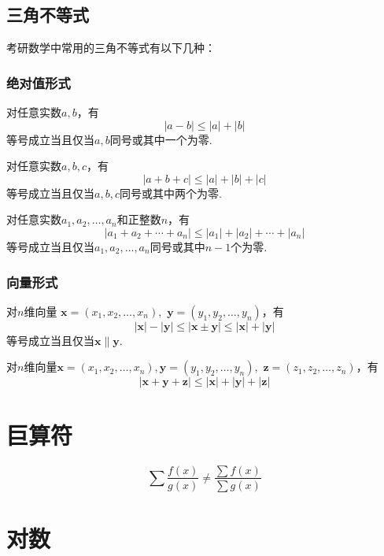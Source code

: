 \subsection{三角不等式}
考研数学中常用的三角不等式有以下几种：

\subsubsection{绝对值形式}
对任意实数$a,b$，有
\begin{equation}
	|a-b| \leq |a|+|b|
\end{equation}
等号成立当且仅当$a,b$同号或其中一个为零.

对任意实数$a,b,c$，有
\begin{equation}
	|a+b+c| \leq |a|+|b|+|c|
\end{equation}
等号成立当且仅当$a,b,c$同号或其中两个为零.

对任意实数$a_1,a_2,\dots,a_n$和正整数$n$，有
\begin{equation}
	|a_1+a_2+\cdots+a_n| \leq |a_1|+|a_2|+\cdots+|a_n|
\end{equation}
等号成立当且仅当$a_1,a_2,\dots,a_n$同号或其中$n-1$个为零.

\subsubsection{向量形式}
对$n$维向量 
$\pmb{x}=(x_1,x_2,\dots,x_n),$
$\pmb{y}=(y_1,y_2,\dots,y_n)$，有
\begin{equation}
	|\pmb{x}|-|\pmb{y}|\leqslant |\pmb{x}\pm\pmb{y}|\leqslant |\pmb{x}|+|\pmb{y}|
\end{equation}
等号成立当且仅当$\pmb{x}\parallel\pmb{y}$.

对$n$维向量$\pmb{x}=(x_1,x_2,\dots,x_n),\pmb{y}=(y_1,y_2,\dots,y_n),$
$\pmb{z}=(z_1,z_2,\dots,z_n)$，有
\begin{equation}
	|\pmb{x}+\pmb{y}+\pmb{z}| \leq |\pmb{x}|+|\pmb{y}|+|\pmb{z}|
\end{equation}

\section{巨算符} \label{giant-operator}

\cite[page A36]{stewart}
\[
    \sum \dfrac{f(x)}{g(x)} \neq \dfrac{\sum f(x)}{\sum g(x)}
\]

\section{对数}\label{logrithemic}

